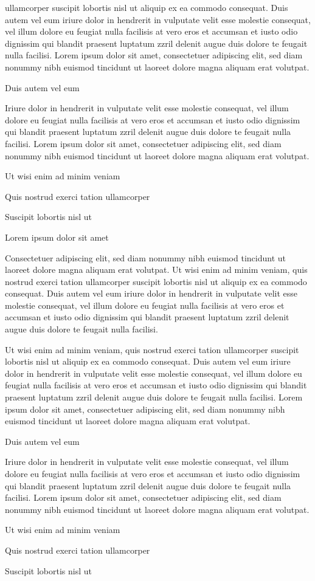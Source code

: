 \documentclass[11pt,twoside]{article}\makeatletter
\begin{document}
      ullamcorper suscipit lobortis nisl ut aliquip ex ea commodo
      consequat. Duis autem vel eum iriure dolor in hendrerit in vulputate
      velit esse molestie consequat, vel illum dolore eu feugiat nulla
      facilisis at vero eros et accumsan et iusto odio dignissim qui blandit
      praesent luptatum zzril delenit augue duis dolore te feugait nulla
      facilisi. Lorem ipsum dolor sit amet, consectetuer adipiscing elit,
      sed diam nonummy nibh euismod tincidunt ut laoreet dolore magna
      aliquam erat volutpat. \par Duis autem vel eum \par Iriure dolor in hendrerit in vulputate velit esse molestie
      consequat, vel illum dolore eu feugiat nulla facilisis at vero eros et
      accumsan et iusto odio dignissim qui blandit praesent luptatum zzril
      delenit augue duis dolore te feugait nulla facilisi. Lorem ipsum dolor
      sit amet, consectetuer adipiscing elit, sed diam nonummy nibh euismod
      tincidunt ut laoreet dolore magna aliquam erat volutpat. \par Ut wisi enim ad minim veniam\par Quis nostrud exerci tation ullamcorper \par Suscipit lobortis nisl ut \par Lorem ipsum dolor sit amet\par Consectetuer adipiscing elit, sed diam nonummy nibh euismod
      tincidunt ut laoreet dolore magna aliquam erat volutpat. Ut wisi enim
      ad minim veniam, quis nostrud exerci tation ullamcorper suscipit
      lobortis nisl ut aliquip ex ea commodo consequat. Duis autem vel eum
      iriure dolor in hendrerit in vulputate velit esse molestie consequat,
      vel illum dolore eu feugiat nulla facilisis at vero eros et accumsan
      et iusto odio dignissim qui blandit praesent luptatum zzril delenit
      augue duis dolore te feugait nulla facilisi.\par Ut wisi enim ad minim veniam, quis nostrud exerci tation
      ullamcorper suscipit lobortis nisl ut aliquip ex ea commodo
      consequat. Duis autem vel eum iriure dolor in hendrerit in vulputate
      velit esse molestie consequat, vel illum dolore eu feugiat nulla
      facilisis at vero eros et accumsan et iusto odio dignissim qui blandit
      praesent luptatum zzril delenit augue duis dolore te feugait nulla
      facilisi. Lorem ipsum dolor sit amet, consectetuer adipiscing elit,
      sed diam nonummy nibh euismod tincidunt ut laoreet dolore magna
      aliquam erat volutpat. \par Duis autem vel eum \par Iriure dolor in hendrerit in vulputate velit esse molestie
      consequat, vel illum dolore eu feugiat nulla facilisis at vero eros et
      accumsan et iusto odio dignissim qui blandit praesent luptatum zzril
      delenit augue duis dolore te feugait nulla facilisi. Lorem ipsum dolor
      sit amet, consectetuer adipiscing elit, sed diam nonummy nibh euismod
      tincidunt ut laoreet dolore magna aliquam erat volutpat. \par Ut wisi enim ad minim veniam\par Quis nostrud exerci tation ullamcorper \par Suscipit lobortis nisl ut 
\end{document}
